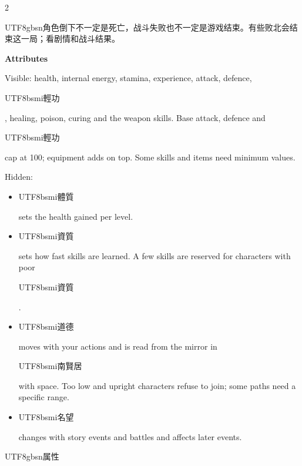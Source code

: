 \begin{paracol}{2}
\begin{CJK}{UTF8}{gbsn}角色倒下不一定是死亡，战斗失败也不一定是游戏结束。有些败北会结束这一局；看剧情和战斗结果。\end{CJK}\par
\switchcolumn*
\footnotesize\setlength{\parskip}{2pt}
{\footnotesize\bfseries Attributes\par}
Visible: health, internal energy, stamina, experience, attack, defence, \begin{CJK}{UTF8}{bsmi}輕功\end{CJK}, healing, poison, curing and the weapon skills. Base attack, defence and \begin{CJK}{UTF8}{bsmi}輕功\end{CJK} cap at 100; equipment adds on top. Some skills and items need minimum values.\par
Hidden:\par
\begin{itemize}[leftmargin=*,topsep=1pt,itemsep=0pt,parsep=0pt]\item \begin{CJK}{UTF8}{bsmi}體質\end{CJK} sets the health gained per level.\item \begin{CJK}{UTF8}{bsmi}資質\end{CJK} sets how fast skills are learned. A few skills are reserved for characters with poor \begin{CJK}{UTF8}{bsmi}資質\end{CJK}.\item \begin{CJK}{UTF8}{bsmi}道德\end{CJK} moves with your actions and is read from the mirror in \begin{CJK}{UTF8}{bsmi}南賢居\end{CJK} with space. Too low and upright characters refuse to join; some paths need a specific range.\item \begin{CJK}{UTF8}{bsmi}名望\end{CJK} changes with story events and battles and affects later events.\end{itemize}
\switchcolumn
\footnotesize\setlength{\parskip}{2pt}
{\footnotesize\bfseries \begin{CJK}{UTF8}{gbsn}属性\end{CJK}\par}

\end{paracol}
